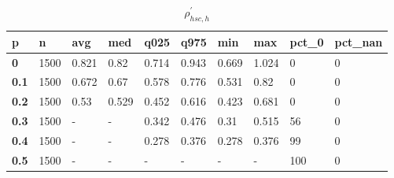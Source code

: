 \begin{table}[h]
 \centering 
\footnotesize
\caption{$\rho_{hsc,h}^\prime $}
\label{tab:alphahsch}
\begin{tabular}[h]{|l|l|l|l|l|l|l|l|l|l|
    } \hline
\textbf{ p} & \textbf{ n} & \textbf{ avg} & \textbf{ med} & \textbf{ q025} & \textbf{ q975} & \textbf{ min} & \textbf{ max} & \textbf{ pct\_0} & \textbf{ pct\_nan}
    \\ \hline
  \textbf{  0} & 1500 & 0.821 &  0.82 & 0.714 & 0.943 & 0.669 & 1.024 &   0 & 0
    \\ \hline
  \textbf{0.1} & 1500 & 0.672 &  0.67 & 0.578 & 0.776 & 0.531 &  0.82 &   0 & 0
    \\ \hline
  \textbf{0.2} & 1500 &  0.53 & 0.529 & 0.452 & 0.616 & 0.423 & 0.681 &   0 & 0
    \\ \hline
  \textbf{0.3} & 1500 & - & - & 0.342 & 0.476 &  0.31 & 0.515 &  56 & 0
    \\ \hline
  \textbf{0.4} & 1500 & - & - & 0.278 & 0.376 & 0.278 & 0.376 &  99 & 0
    \\ \hline
  \textbf{0.5} & 1500 & - & - & - & - & - & - & 100 & 0
    \\ \hline
 \end{tabular}
 \end{table}
